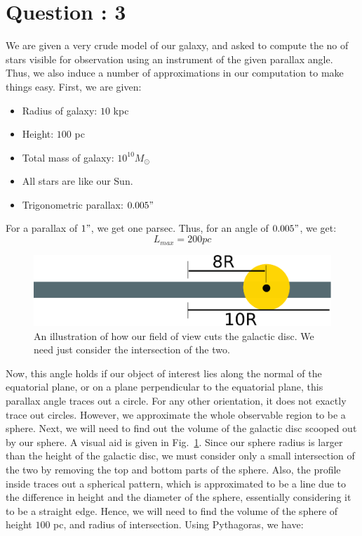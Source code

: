 \documentclass{article}
\begin{document}
\section{Question : 3}
We are given a very crude model of our galaxy, and asked to compute the no of stars visible for observation using an instrument of the given parallax angle. Thus, we also induce a number of approximations in our computation to make things easy.
First, we are given:
\begin{itemize}
\item Radius of galaxy: $10$ kpc
\item Height: $100$ pc
\item Total mass of galaxy: $10^{10}M_\odot$
\item All stars are like our Sun.
\item Trigonometric parallax: $0.005"$
\end{itemize}
For a parallax of $1"$, we get one parsec. Thus, for an angle of $0.005"$, we get:
$$
L_{max} = 200pc
$$
\begin{figure}[!h]
\begin{center}
\includegraphics[width=\textwidth]{A_1_3.eps}
\caption{An illustration of how our field of view cuts the galactic disc. We need just consider the intersection of the two.}
\label{fig:3_1}
\end{center}
\end{figure}
Now, this angle holds if our object of interest lies along the normal of the equatorial plane, or on a plane perpendicular to the equatorial plane, this parallax angle traces out a circle. For any other orientation, it does not exactly trace out circles. However, we approximate the whole observable region to be a sphere. 
Next, we will need to find out the volume of the galactic disc scooped out by our sphere.  A visual aid is given in Fig.~\ref{fig:3_1}. Since our sphere radius is larger than the height of the galactic disc, we must consider only a small intersection of the two by removing the top and bottom parts of the sphere. Also, the profile inside traces out a spherical pattern, which is approximated to be a line due to the difference in height and the diameter of the sphere, essentially considering it to be a straight edge. Hence, we will need to find the volume of the sphere of height $100$ pc, and radius of intersection. Using Pythagoras, we have:
\end{document}
